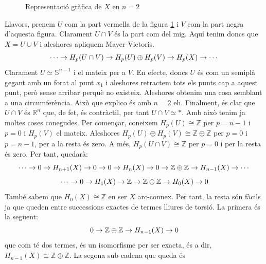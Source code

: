 \documentclass[../main.tex]{subfiles}
\begin{document}
\begin{sol}
\begin{enumerate}
\begin{figure}
        \caption{Representació gràfica de $X$ en $n=2$}
        \label{fig:representaciograficadexexercicimv}
    \end{figure}
    
    Llavors, prenem $U$ com la part vermella de la figura \ref{fig:representaciograficadexexercicimv} i $V$ com la part negra d'aquesta figura. Clarament $U\cap V$ és la part com del mig. Aquí tenim doncs que $X = U\cup V$ i aleshores apliquem Mayer-Vietoris. 
    \begin{equation}
        \notag
        \cdots\rightarrow H_p(U\cap V)\rightarrow H_p(U)\oplus H_p(V)\rightarrow H_p(X)\rightarrow\cdots
    \end{equation}
    Clarament $U\simeq \mathbb{S}^{n-1}$ i el mateix per a $V$. En efecte, doncs $U$ és com un semiplà gegant amb un forat al punt $x_1$ i aleshores retractem tots els punts cap a aquest punt, però sense arribar perquè no existeix. Aleshores obtenim una cosa semblant a una circumferència. Això que explico és amb $n = 2$ eh. Finalment, és clar que $U\cap V$ és $\mathbb{R}^n$ que, de fet, és contràctil, per tant $U\cap V\simeq *$. Amb això tenim ja moltes coses conegudes. Per començar, coneixem $H_p(U)\cong \mathbb{Z}$ per $p=n-1$ i $p = 0$ i $H_p(V)$ el mateix. Aleshores $H_p(U)\oplus H_p(V)\cong\mathbb{Z}\oplus \mathbb{Z}$ per $p=0$ i $p = n-1$, per a la resta és zero. A més, $H_p(U\cap V)\cong\mathbb{Z}$ per $p = 0$ i per la resta és zero. Per tant, quedarà:
    \begin{equation}
        \notag
        \cdots\rightarrow 0\rightarrow H_{n+1}(X)\rightarrow 0\rightarrow0\rightarrow H_n(X)\rightarrow 0\rightarrow\mathbb{Z}\oplus\mathbb{Z}\rightarrow H_{n-1}(X)\rightarrow\cdots
    \end{equation}
    \begin{equation}
        \notag
        \cdots\rightarrow 0\rightarrow H_1(X)\rightarrow \mathbb{Z}\rightarrow \mathbb{Z}\oplus\mathbb{Z}\rightarrow H_0(X)\rightarrow 0
    \end{equation}
    També sabem que $H_0(X)\cong \mathbb{Z}$ en ser $X$ arc-connex. Per tant, la resta són fàcils ja que queden entre successions exactes de termes lliures de torsió. La primera és la següent:
    \begin{equation}
        \notag
        0\rightarrow \mathbb{Z}\oplus\mathbb{Z}\rightarrow H_{n-1}(X)\rightarrow 0
    \end{equation}
    que com té dos termes, és un isomorfisme per ser exacta, és a dir, $H_{n-1}(X)\cong \mathbb{Z}\oplus\mathbb{Z}$. La segona sub-cadena que queda és

\end{enumerate}
\end{sol}
\end{document}
